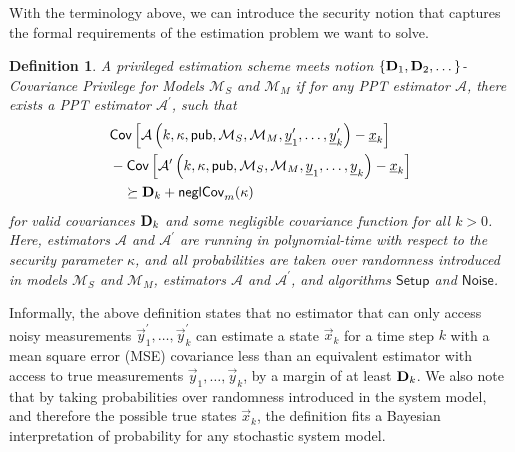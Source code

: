 \documentclass[letterpaper, 10 pt, conference]{ieeeconf}
\newtheorem{definition}{Definition}[section]
\begin{document}
With the terminology above, we can introduce the security notion that captures the formal requirements of the estimation problem we want to solve.
\begin{definition}\label{def:cov_privilege_security_notion}
   A privileged estimation scheme meets notion \textit{$\{{{\mathbf{D}}}_1,{{\mathbf{D}}}_2,\dots\}$-Covariance Privilege for Models $\mathcal{M}_S$ and $\mathcal{M}_M$} if for any PPT estimator $\mathcal{A}$, there exists a PPT estimator $\mathcal{A}^\prime$, such that
   \begin{equation}\label{eqn:cov_privilege}
      \begin{split}
         &\mathsf{Cov}\left[\mathcal{A}\left(k, \kappa, \mathsf{pub}, \mathcal{M}_S, \mathcal{M}_M, {\underline{y}}^\prime_1,\dots,{\underline{y}}^\prime_k\right) - {\underline{x}}_k \right]\\
         &-\mathsf{Cov}\left[\mathcal{A}^\prime\left(k, \kappa, \mathsf{pub}, \mathcal{M}_S, \mathcal{M}_M, {\underline{y}}_1,\dots,{\underline{y}}_k\right) - {\underline{x}}_k \right]\\
         &\quad\succeq {\ensuremath{{\mathbf{D}}}}_k + \mathsf{neglCov}_m(\kappa)
      \end{split}
   \end{equation}
   for valid covariances ${{\mathbf{D}}}_k$ and some negligible covariance function for all $k>0$. Here, estimators $\mathcal{A}$ and $\mathcal{A}^\prime$ are running in polynomial-time with respect to the security parameter $\kappa$, and all probabilities are taken over randomness introduced in models $\mathcal{M}_S$ and $\mathcal{M}_M$, estimators $\mathcal{A}$ and $\mathcal{A}^\prime$, and algorithms $\mathsf{Setup}$ and $\mathsf{Noise}$.
\end{definition}

Informally, the above definition states that no estimator that can only access noisy measurements $\vec{y}^\prime_1,\dots,\vec{y}^\prime_k$ can estimate a state $\vec{x}_k$ for a time step $k$ with a mean square error (MSE) covariance less than an equivalent estimator with access to true measurements $\vec{y}_1,\dots,\vec{y}_k$, by a margin of at least ${{\mathbf{D}}}_k$. We also note that by taking probabilities over randomness introduced in the system model, and therefore the possible true states $\vec{x}_k$, the definition fits a Bayesian interpretation of probability for any stochastic system model.

% 
% 
\end{document}
